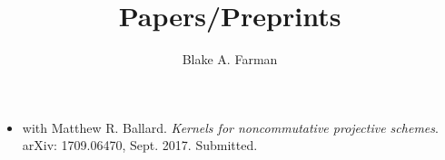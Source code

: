 \documentclass[11pt]{amsart}
\title{Papers/Preprints}
\author{Blake A. Farman}
\date{}
\begin{document}
\maketitle

\begin{itemize}
\item
  with Matthew R. Ballard. \textit{Kernels for noncommutative projective schemes}.
  arXiv: 1709.06470, Sept. 2017. Submitted.
\end{itemize}
\end{document}
